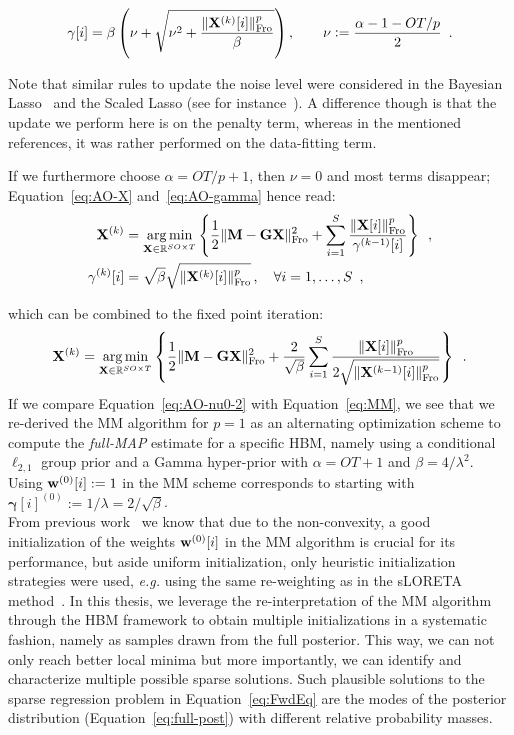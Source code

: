 \begin{equation}
\mathbf{\gamma}[i] = \beta \left( \nu + \sqrt{ \nu^2 + \frac{\|{\mathbf{X}^{(k)}[i]}\|_{\rm Fro}^p}{\beta}} \right), \qquad \nu \mathrel{\mathop:}= \frac{\alpha - 1 - OT/p}{2} \enspace.
\end{equation}

Note that similar rules to update the noise level were considered in the Bayesian Lasso~\cite{Park_Casella08,Kyung_Gill_Ghosh_Casella10} and the Scaled Lasso (see for instance~\cite{Stadler_Buhlmann_vandeGeer10,Dalalyan12}). A difference though is that the update we perform here is on the penalty term, whereas in the mentioned references, it was rather performed on the data-fitting term.

If we furthermore choose $\alpha = O T/p + 1$, then $\nu = 0$ and most terms disappear; Equation~\eqref{eq:AO-X} and~\eqref{eq:AO-gamma} hence read:
\begin{eqnarray}
\mathbf{X}^{(k)} &= \mathop{\mathrm{arg}\,\mathrm{min}}_{\mathbf{X}\in\mathbb{R}^{SO \times T}} \left\lbrace \frac{1}{2} \|{\mathbf{M} -\mathbf{G} \mathbf{X}}\|_{\rm Fro}^2 + \sum_{i=1}^S \frac{\|{\mathbf{X}[i]}\|_{\rm Fro}^p}{\mathbf{\gamma}^{(k-1)}[i]} \right\rbrace \enspace, \label{eq:AO-nu0-X}\\
\mathbf{\gamma}^{(k)}[i] &= \sqrt{\beta} \sqrt{\|{\mathbf{X}^{(k)}[i]}\|_{\rm Fro}^p} \, , \quad \forall i=1,\ldots,S \enspace, \label{eq:AO-nu0-gamma}
\end{eqnarray}

which can be combined to the fixed point iteration:
\begin{equation} \label{eq:AO-nu0-2}
\mathbf{X}^{(k)} = \mathop{\mathrm{arg}\,\mathrm{min}}_{\mathbf{X}\in\mathbb{R}^{SO \times T}} \left\lbrace \frac{1}{2} \|{\mathbf{M} -\mathbf{G} \mathbf{X}}\|_{\rm Fro}^2 + \frac{2}{\sqrt{\beta}} \sum_{i=1}^S  \frac{\|{\mathbf{X}[i]}\|_{\rm Fro}^p}{2 \sqrt{\|{\mathbf{X}^{(k-1)}[i]}\|_{\rm Fro}^p}} \right\rbrace \enspace .
\end{equation}
If we compare Equation~\eqref{eq:AO-nu0-2} with Equation~\eqref{eq:MM}, we see that we re-derived the MM algorithm for $p=1$ as an alternating optimization scheme to compute the \emph{full-MAP} estimate for a specific HBM, namely using a conditional $\ell_{2,1}$ group prior and a Gamma hyper-prior with $\alpha = OT + 1$ and $\beta = 4/\lambda^2$. Using $\mathbf{w}^{(0)}[i] := 1$ in the MM scheme corresponds to starting with $\mathbf{\gamma}[i]^{(0)} := 1/\lambda =  2/\sqrt{\beta}$.\\

From previous work~\cite{strohmeier-etal:16} we know that due to the non-convexity, a good initialization of the weights $\mathbf{w}^{(0)}[i]$ in the MM algorithm is crucial for its performance, but aside uniform initialization, only heuristic initialization strategies were used, \textit{e.g.} using the same re-weighting as in the sLORETA method~\cite{Pa02}. In this thesis, we leverage the re-interpretation of the MM algorithm through the HBM framework to obtain multiple initializations in a systematic fashion, namely as samples drawn from the full posterior. This way, we can not only reach better local minima but more importantly, we can identify and characterize multiple possible sparse solutions. Such plausible solutions to the sparse regression problem in Equation~\eqref{eq:FwdEq} are the modes of the posterior distribution (Equation~\eqref{eq:full-post}) with different relative probability masses.

